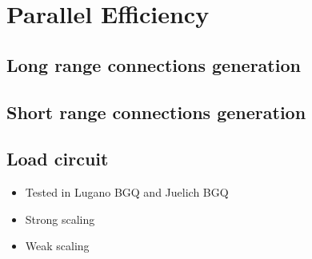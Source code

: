 \newpage
\section{Parallel Efficiency}

\subsection{Long range connections generation}
\subsection{Short range connections generation}
\subsection{Load circuit}

\begin{itemize}
      \item Tested in Lugano BGQ and Juelich BGQ
      \item Strong scaling
      \item Weak scaling
\end{itemize}

